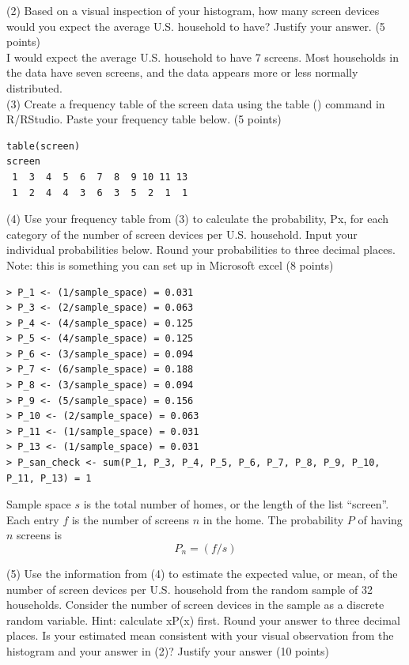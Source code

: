 \documentclass{article}
\begin{document}
(2) Based on a visual inspection of your histogram, how many screen devices would you expect the average U.S. household to have? Justify your answer. (5 points) \\

I would expect the average U.S. household to have 7 screens. Most households in the data have seven screens, and the data appears more or less normally distributed. \\

(3) Create a frequency table of the screen data using the table () command in R/RStudio. Paste your frequency table below. (5 points) \\

\begin{center}
\begin{lstlisting}
table(screen)
screen
 1  3  4  5  6  7  8  9 10 11 13 
 1  2  4  4  3  6  3  5  2  1  1 
\end{lstlisting}
\end{center}
(4) Use your frequency table from (3) to calculate the probability, Px, for each category of the number of screen devices per U.S. household. Input your individual probabilities below. Round your probabilities to three decimal places. Note: this is something you can set up in Microsoft excel (8 points)\\

\begin{center}
\begin{lstlisting}
> P_1 <- (1/sample_space) = 0.031
> P_3 <- (2/sample_space) = 0.063
> P_4 <- (4/sample_space) = 0.125
> P_5 <- (4/sample_space) = 0.125
> P_6 <- (3/sample_space) = 0.094
> P_7 <- (6/sample_space) = 0.188
> P_8 <- (3/sample_space) = 0.094
> P_9 <- (5/sample_space) = 0.156
> P_10 <- (2/sample_space) = 0.063
> P_11 <- (1/sample_space) = 0.031
> P_13 <- (1/sample_space) = 0.031
> P_san_check <- sum(P_1, P_3, P_4, P_5, P_6, P_7, P_8, P_9, P_10, P_11, P_13) = 1
\end{lstlisting}
\end{center}

Sample space $s$ is the total number of homes, or the length of the list ``screen''. Each entry $f$ is the number of screens $n$ in the home. The probability $P$ of having $n$ screens is 
\[
P_n = (f / s)
\]

(5) Use the information from (4) to estimate the expected value, or mean, of the number of screen devices per U.S. household from the random sample of 32 households. Consider the number of screen devices in the sample as a discrete random variable. Hint: calculate xP(x) first. Round your answer to three decimal places. Is your estimated mean consistent with your visual observation from the histogram and your answer in (2)? Justify your answer (10 points)\\
\end{document}
